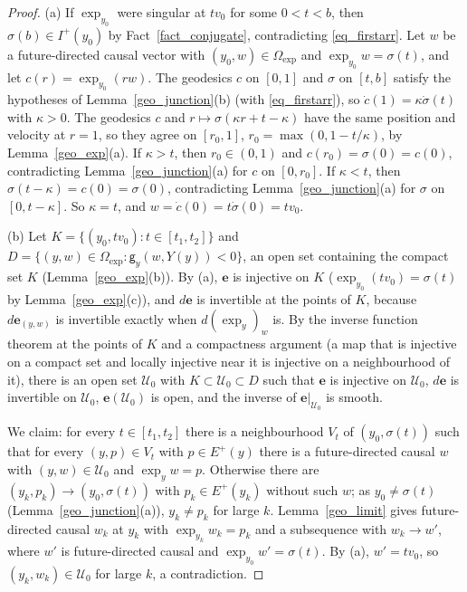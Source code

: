 \documentclass[11pt,a4paper,reqno]{amsart}
\theoremstyle{definition}
\numberwithin{equation}{section}
\newcommand{\cE}{\mathbf{e}}
\newcommand{\cU}{\mathcal{U}}
\newcommand{\sg}{\mathsf{g}}
\newcommand{\Ehor}{E}
\begin{document}
\begin{proof}
(a) If $\exp_{y_0}$ were singular at $tv_0$ for some $0<t<b$, then $\sigma(b)\in I^+(y_0)$ by Fact~\ref{fact_conjugate},
contradicting \eqref{eq_firstarr}. Let $w$ be a future-directed causal vector with $(y_0,w)\in\Omega_{\exp}$ and
$\exp_{y_0}w=\sigma(t)$, and let $c(r)=\exp_{y_0}(rw)$. The geodesics $c$ on $[0,1]$ and $\sigma$ on $[t,b]$ satisfy the
hypotheses of Lemma~\ref{geo_junction}(b) (with \eqref{eq_firstarr}), so $\dot c(1)=\kappa\dot\sigma(t)$ with $\kappa>0$. The
geodesics $c$ and $r\mapsto\sigma(\kappa r+t-\kappa)$ have the same position and velocity at $r=1$, so they agree on
$[r_0,1]$, $r_0=\max(0,1-t/\kappa)$, by Lemma~\ref{geo_exp}(a). If $\kappa>t$, then $r_0\in(0,1)$ and
$c(r_0)=\sigma(0)=c(0)$, contradicting Lemma~\ref{geo_junction}(a) for $c$ on $[0,r_0]$. If $\kappa<t$, then
$\sigma(t-\kappa)=c(0)=\sigma(0)$, contradicting Lemma~\ref{geo_junction}(a) for $\sigma$ on $[0,t-\kappa]$. So $\kappa=t$, and
$w=\dot c(0)=t\dot\sigma(0)=tv_0$.

(b) Let $K=\{(y_0,tv_0):t\in[t_1,t_2]\}$ and $D=\{(y,w)\in\Omega_{\exp}:\sg_y(w,Y(y))<0\}$, an open set containing the compact
set $K$ (Lemma~\ref{geo_exp}(b)). By (a), $\cE$ is injective on $K$ ($\exp_{y_0}(tv_0)=\sigma(t)$ by Lemma~\ref{geo_exp}(c)), and
$d\cE$ is invertible at the points of $K$, because $d\cE_{(y,w)}$ is invertible exactly when $d(\exp_y)_w$ is. By the inverse
function theorem at the points of $K$ and a compactness argument (a map that is injective on a compact set and locally
injective near it is injective on a neighbourhood of it), there is an open set $\cU_0$ with $K\subset\cU_0\subset D$ such that
$\cE$ is injective on $\cU_0$, $d\cE$ is invertible on $\cU_0$, $\cE(\cU_0)$ is open, and the inverse of $\cE|_{\cU_0}$ is smooth.

We claim: for every $t\in[t_1,t_2]$ there is a neighbourhood $V_t$ of $(y_0,\sigma(t))$ such that for every $(y,p)\in V_t$ with
$p\in\Ehor^+(y)$ there is a future-directed causal $w$ with $(y,w)\in\cU_0$ and $\exp_yw=p$. Otherwise there are
$(y_k,p_k)\to(y_0,\sigma(t))$ with $p_k\in\Ehor^+(y_k)$ without such $w$; as $y_0\ne\sigma(t)$ (Lemma~\ref{geo_junction}(a)),
$y_k\ne p_k$ for large $k$. Lemma~\ref{geo_limit} gives future-directed causal $w_k$ at $y_k$ with $\exp_{y_k}w_k=p_k$ and a
subsequence with $w_k\to w'$, where $w'$ is future-directed causal and $\exp_{y_0}w'=\sigma(t)$. By (a), $w'=tv_0$, so
$(y_k,w_k)\in\cU_0$ for large $k$, a contradiction.


\end{proof}
\end{document}
